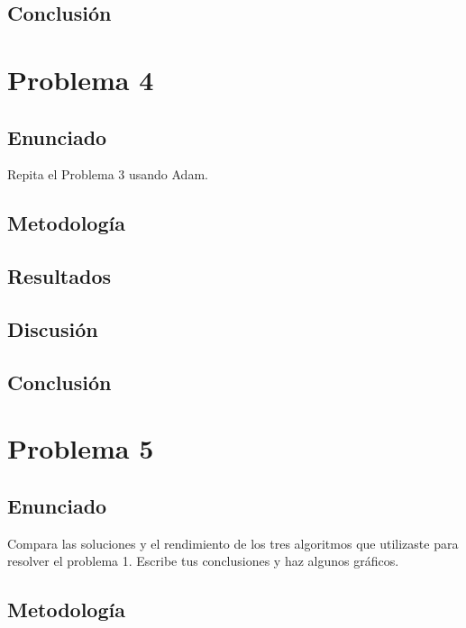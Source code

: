 \documentclass{article}
\begin{document}
\subsection{Conclusión}

\section{Problema 4}

\subsection{Enunciado}

Repita el Problema 3 usando Adam.

\subsection{Metodología}

\subsection{Resultados}
\setcounter{equation}{0}

\subsection{Discusión}

\subsection{Conclusión}

\section{Problema 5}

\subsection{Enunciado}

Compara las soluciones y el rendimiento de los tres algoritmos que utilizaste para resolver el problema 1. Escribe tus conclusiones y haz algunos gráficos.

\subsection{Metodología}
\end{document}
